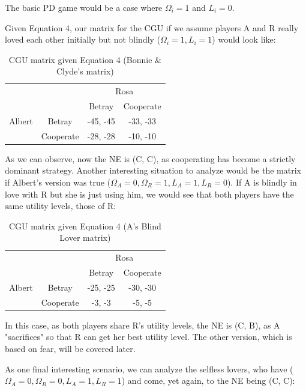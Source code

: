 \documentclass[11pt, a4paper]{article}
\begin{document}
The basic PD game would be a case where $\Omega_i = 1$ and $L_i = 0$.

Given Equation 4, our matrix for the CGU if we assume players A and R really loved each other initially but not blindly ($\Omega_i = 1, L_i = 1$) would look like: 

\begin{table}[h]
\centering
\begin{tabular}{cc|c|c|}
\cline{3-4}
& & \multicolumn{2}{c|}{Rosa} \\ \cline{3-4}
& & Betray & Cooperate \\ \hline
\multicolumn{1}{|c|}{Albert} & Betray & -45, -45 & -33, -33 \\ \cline{2-4}
\multicolumn{1}{|c|}{} & Cooperate & -28, -28 & -10, -10 \\ \hline
\end{tabular}
\caption{CGU matrix given Equation 4 (Bonnie \& Clyde's matrix)}
\label{your_label_here}
\end{table}

As we can observe, now the NE is (C, C), as cooperating has become a strictly dominant strategy. Another interesting situation to analyze would be the matrix if Albert's version was true ($\Omega_A = 0, \Omega_R = 1, L_A = 1, L_R = 0$). If A is blindly in love with R but she is just using him, we would see that both players have the same utility levels, those of R:

\begin{table}[h]
\centering
\begin{tabular}{cc|c|c|}
\cline{3-4}
& & \multicolumn{2}{c|}{Rosa} \\ \cline{3-4}
& & Betray & Cooperate \\ \hline
\multicolumn{1}{|c|}{Albert} & Betray & -25, -25 & -30, -30 \\ \cline{2-4}
\multicolumn{1}{|c|}{} & Cooperate & -3, -3 & -5, -5 \\ \hline
\end{tabular}
\caption{CGU matrix given Equation 4 (A's Blind Lover matrix)}
\label{your_label_here}
\end{table}

In this case, as both players share R's utility levels, the NE is (C, B), as A "sacrifices" so that R can get her best utility level. The other version, which is based on fear, will be covered later.

As one final interesting scenario, we can analyze the selfless lovers, who have ($\Omega_A = 0, \Omega_R = 0, L_A = 1, L_R = 1$) and come, yet again, to the NE being (C, C):
\end{document}

